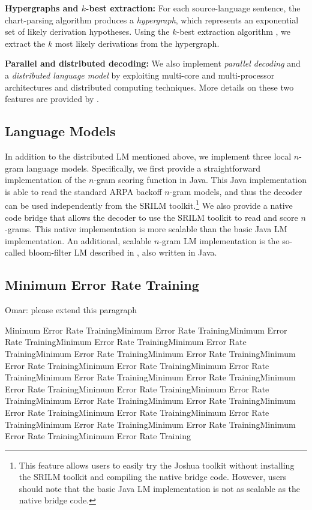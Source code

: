 \documentclass[11pt]{article}
\begin{document}
\textbf{Hypergraphs and $k$-best extraction:}
For each source-language sentence, the chart-parsing algorithm produces a \emph{hypergraph}, which represents an exponential set of likely derivation hypotheses. Using the $k$-best extraction algorithm \cite{liang-kbest}, we extract the $k$ most likely derivations from the hypergraph.

\textbf{Parallel and distributed decoding:}
We also implement \emph{parallel decoding} and a \emph{distributed language model} by exploiting multi-core and multi-processor architectures and distributed computing techniques. More details on these two features are provided by .

\subsection{Language Models}
In addition to the distributed LM mentioned above, we implement three local $n$-gram language models. Specifically, we first provide a straightforward implementation of the $n$-gram scoring function in Java. This Java implementation is able to read the standard ARPA backoff $n$-gram models, and thus the decoder can be used independently from the SRILM toolkit.\footnote{This feature allows users to easily try the Joshua toolkit without installing the SRILM toolkit and compiling the native bridge code. However, users should note that the basic Java LM implementation is not as scalable as the native bridge code.} We also provide a native code bridge that allows the decoder to use the SRILM toolkit to read and score $n$-grams. This native implementation is more scalable than the basic Java LM implementation. An additional, scalable $n$-gram LM implementation is the so-called bloom-filter LM described in , also written in Java.

\subsection{Minimum Error Rate Training}
Omar: please extend this paragraph

Minimum Error Rate TrainingMinimum Error Rate TrainingMinimum Error Rate TrainingMinimum Error Rate TrainingMinimum Error Rate TrainingMinimum Error Rate TrainingMinimum Error Rate TrainingMinimum Error Rate TrainingMinimum Error Rate TrainingMinimum Error Rate TrainingMinimum Error Rate TrainingMinimum Error Rate TrainingMinimum Error Rate TrainingMinimum Error Rate TrainingMinimum Error Rate TrainingMinimum Error Rate TrainingMinimum Error Rate TrainingMinimum Error Rate TrainingMinimum Error Rate TrainingMinimum Error Rate TrainingMinimum Error Rate TrainingMinimum Error Rate TrainingMinimum Error Rate TrainingMinimum Error Rate Training
\end{document}
